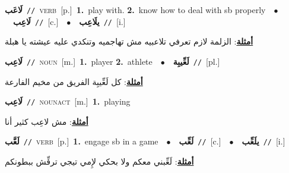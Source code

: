 \documentclass[10pt,a4paper,twoside]{article} %
\begin{document}
\begin{multicols}{2}
{\setlength\topsep{0pt}\textbf{\foreignlanguage{arabic}{لَاعَب}}\ {\color{gray}\texttt{//}\color{black}}\ \textsc{verb}\ [p.]\ \textbf{1.}~play with.  \textbf{2.}~know how to deal with sb properly\ \ $\bullet$\ \ \setlength\topsep{0pt}\textbf{\foreignlanguage{arabic}{لَاعِب}}\ {\color{gray}\texttt{//}\color{black}}\ [c.]\ \ $\bullet$\ \ \setlength\topsep{0pt}\textbf{\foreignlanguage{arabic}{يلَاعِب}}\ {\color{gray}\texttt{//}\color{black}}\ [i.]\  \begin{flushright}\color{gray}\foreignlanguage{arabic}{\textbf{\underline{\foreignlanguage{arabic}{أمثلة}}}: الزلمة لازم تعرفي تلاعبيه مش تهاجميه وتنكدي عليه عيشته يا هبلة}\end{flushright}\color{black}} \vspace{2mm}

{\setlength\topsep{0pt}\textbf{\foreignlanguage{arabic}{لَاعِب}}\ {\color{gray}\texttt{//}\color{black}}\ \textsc{noun}\ [m.]\ \textbf{1.}~player  \textbf{2.}~athlete\ \ $\bullet$\ \ \setlength\topsep{0pt}\textbf{\foreignlanguage{arabic}{لَعِّيبِة}}\ {\color{gray}\texttt{//}\color{black}}\ [pl.]\  \begin{flushright}\color{gray}\foreignlanguage{arabic}{\textbf{\underline{\foreignlanguage{arabic}{أمثلة}}}: كل لَعِّيبِة الفريق من مخيم الفارعة}\end{flushright}\color{black}} \vspace{2mm}

{\setlength\topsep{0pt}\textbf{\foreignlanguage{arabic}{لَاعِب}}\ {\color{gray}\texttt{//}\color{black}}\ \textsc{noun\textunderscore act}\ [m.]\ \textbf{1.}~playing\  \begin{flushright}\color{gray}\foreignlanguage{arabic}{\textbf{\underline{\foreignlanguage{arabic}{أمثلة}}}: مش لاعِب كثير أنا}\end{flushright}\color{black}} \vspace{2mm}

{\setlength\topsep{0pt}\textbf{\foreignlanguage{arabic}{لَعَّب}}\ {\color{gray}\texttt{//}\color{black}}\ \textsc{verb}\ [p.]\ \textbf{1.}~engage sb in a game\ \ $\bullet$\ \ \setlength\topsep{0pt}\textbf{\foreignlanguage{arabic}{لَعِّب}}\ {\color{gray}\texttt{//}\color{black}}\ [c.]\ \ $\bullet$\ \ \setlength\topsep{0pt}\textbf{\foreignlanguage{arabic}{يلَعِّب}}\ {\color{gray}\texttt{//}\color{black}}\ [i.]\  \begin{flushright}\color{gray}\foreignlanguage{arabic}{\textbf{\underline{\foreignlanguage{arabic}{أمثلة}}}: لَعِّبني معكم ولا بحكي لإِمي تيجي ترفِّش ببطونكم}\end{flushright}\color{black}} \vspace{2mm}


\end{multicols}
\end{document}
